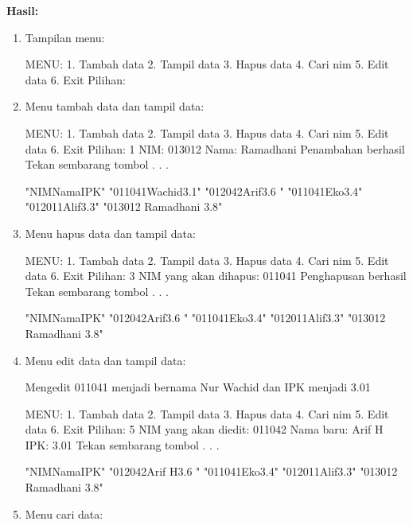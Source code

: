 \textbf{Hasil:}

\begin{enumerate}

\item
Tampilan menu:

 \begin{lcverbatim}
MENU:
1. Tambah data
2. Tampil data
3. Hapus data
4. Cari nim
5. Edit data
6. Exit
Pilihan:
 \end{lcverbatim}

\item
Menu tambah data dan tampil data:

 \begin{lcverbatim}
 MENU:
 1. Tambah data
 2. Tampil data
 3. Hapus data
 4. Cari nim
 5. Edit data
 6. Exit
 Pilihan: 1
 NIM: 013012
 Nama: Ramadhani
 Penambahan berhasil
 Tekan sembarang tombol . . .
 \end{lcverbatim}

\begin{lcverbatim}
"NIMNamaIPK" 
"011041Wachid3.1" 
"012042Arif3.6 "
"011041Eko3.4"
"012011Alif3.3" 
"013012 Ramadhani 3.8" 
\end{lcverbatim}
\item
Menu hapus data dan tampil data:

 \begin{lcverbatim}
MENU:
1. Tambah data
2. Tampil data
3. Hapus data
4. Cari nim
5. Edit data
6. Exit
Pilihan: 3
NIM yang akan dihapus: 011041
Penghapusan berhasil
Tekan sembarang tombol . . .
\end{lcverbatim}
\begin{lcverbatim}
"NIMNamaIPK" 
"012042Arif3.6 "
"011041Eko3.4"
"012011Alif3.3" 
"013012 Ramadhani 3.8" 
\end{lcverbatim}
 
\item
Menu edit data dan tampil data: 

Mengedit 011041 menjadi bernama
Nur Wachid dan IPK menjadi 3.01

\begin{lcverbatim}
MENU:
1. Tambah data
2. Tampil data
3. Hapus data
4. Cari nim
5. Edit data
6. Exit
Pilihan: 5
NIM yang akan diedit: 011042
Nama baru: Arif H
IPK: 3.01
Tekan sembarang tombol . . .
\end{lcverbatim}

\begin{lcverbatim}
"NIMNamaIPK" 
"012042Arif H3.6 "
"011041Eko3.4"
"012011Alif3.3" 
"013012 Ramadhani 3.8" 
\end{lcverbatim}
\item
Menu cari data:


\end{enumerate}
